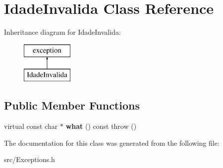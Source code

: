 \hypertarget{class_idade_invalida}{}\section{Idade\+Invalida Class Reference}
\label{class_idade_invalida}
Inheritance diagram for Idade\+Invalida\+:\begin{figure}[H]
\begin{center}
\leavevmode
\includegraphics[height=2.000000cm]{class_idade_invalida}
\end{center}
\end{figure}
\subsection*{Public Member Functions}
\begin{DoxyCompactItemize}
\item 
\hypertarget{class_idade_invalida_aeac23b63d8109676c4597db7ee2487e9}{}virtual const char $\ast$ {\bfseries what} () const   throw ()\label{class_idade_invalida_aeac23b63d8109676c4597db7ee2487e9}

\end{DoxyCompactItemize}


The documentation for this class was generated from the following file\+:\begin{DoxyCompactItemize}
\item 
src/Exceptions.\+h\end{DoxyCompactItemize}
